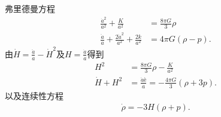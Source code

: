 \documentclass{article}
\begin{document}
弗里德曼方程
\begin{align}
  \frac{\dot{a}^2}{a^2}+\frac{K}{a^2} &=\frac{8\pi G}{3}\rho \\
  \frac{\ddot{a}}{a}+\frac{2\dot{a}^2}{a^2}+\frac{2k}{a^2}&=4\pi
  G{\left(\rho-p\right)}.
\end{align}
由$\dot{H}=\frac{\ddot{a}}{a}-\dot{H}^2$及$H=\frac{\dot{a}}{a}$得到
\begin{align}
  \label{eq:friedmann-equation}
  H^2 &=\frac{8\pi G}{3}\rho -\frac{K}{a^2} \\
  \label{eq:accelaration-equation}
  \dot{H}+H^2 &= \frac{\ddot{a}è}{a}=-\frac{4\pi
  G}{3}{\left(\rho+3p\right)}.
\end{align}
以及连续性方程
\begin{align}
  \label{eq:continuation-equation}
  \dot{\rho}=-3H{\left(\rho+p\right)}.
\end{align}
\end{document}
